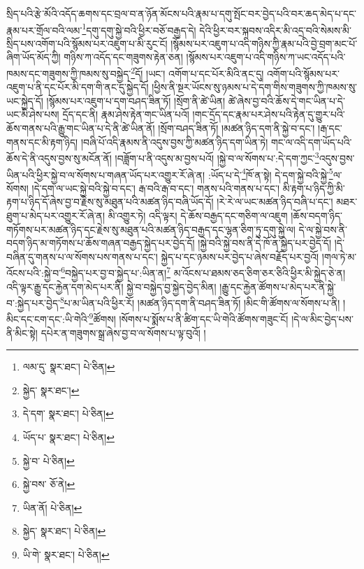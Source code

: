 སྲིད་པའི་རྩེ་མོའི་འདོད་ཆགས་དང་བྲལ་བ་ན་ཉོན་མོངས་པའི་རྣམ་པ་དགུ་སྤོང་བར་བྱེད་པའི་བར་ཆད་མེད་པ་དང་རྣམ་པར་གྲོལ་བའི་ལམ་\footnote{ལམ་དུ་  སྣར་ཐང་།  པེ་ཅིན། }དགུ་དགུ་སྐྱེ་བའི་ཕྱིར་བཅོ་བརྒྱད་དེ། དེའི་ཕྱིར་བར་སྐབས་འདིར་མི་འདྲ་བའི་སེམས་མི་སྲིད་པས་འགོག་པའི་སྙོམས་པར་འཇུག་པ་མི་རུང་ངོ། །སྙོམས་པར་འཇུག་པ་འདི་གཉིས་ཀྱི་རྣམ་པའི་བྱེ་བྲག་མང་པོ་ཞིག་ཡོད་མོད་ཀྱི། གཉིས་ཀ་འདོད་དང་གཟུགས་རྟེན་ཅན། །སྙོམས་པར་འཇུག་པ་འདི་གཉིས་ཀ་ཡང་འདོད་པའི་ཁམས་དང་གཟུགས་ཀྱི་ཁམས་སུ་བསྐྱེད་\footnote{སྐྱེད་  སྣར་ཐང་། }དོ། །ཡང་། འགོག་པ་དང་པོར་མིའི་ནང་དུ། འགོག་པའི་སྙོམས་པར་འཇུག་པ་ནི་དང་པོར་མི་དག་གི་ནང་དུ་སྐྱེད་དོ། །ཕྱིས་ནི་སྔར་ཡོངས་སུ་ཉམས་པ་དེ་དག་གིས་གཟུགས་ཀྱི་ཁམས་སུ་ཡང་སྐྱེད་དོ། །སྙོམས་པར་འཇུག་པ་དག་བཤད་ཟིན་ཏོ། །སྲོག་ནི་ཚེ་ཡིན། ཚེ་ཞེས་བྱ་བའི་ཆོས་དེ་གང་ཡིན་པ་དེ་ཡང་མི་ཤེས་པས། དྲོད་དང་ནི། རྣམ་ཤེས་རྟེན་གང་ཡིན་པའོ། །གང་དྲོད་དང་རྣམ་པར་ཤེས་པའི་རྟེན་དུ་གྱུར་པའི་ཆོས་གནས་པའི་རྒྱུ་གང་ཡིན་པ་དེ་ནི་ཚེ་ཡིན་ནོ། །སྲོག་བཤད་ཟིན་ཏོ། །མཚན་ཉིད་དག་ནི་སྐྱེ་བ་དང་། །རྒ་དང་གནས་དང་མི་རྟག་ཉིད། །བཞི་པོ་འདི་རྣམས་ནི་འདུས་བྱས་ཀྱི་མཚན་ཉིད་དག་ཡིན་ཏེ། གང་ལ་འདི་དག་ཡོད་པའི་ཆོས་དེ་ནི་འདུས་བྱས་སུ་མངོན་ནོ། །བཟློག་པ་ནི་འདུས་མ་བྱས་པའོ། །སྐྱེ་བ་ལ་སོགས་པ་:དེ་དག་ཀྱང་\footnote{དེ་དག་  སྣར་ཐང་།  པེ་ཅིན། }འདུས་བྱས་ཡིན་པའི་ཕྱིར་སྐྱེ་བ་ལ་སོགས་པ་གཞན་ཡོད་པར་འགྱུར་རོ་ཞེ་ན། :ཡོད་པ་དེ་\footnote{ཡོད་པ་  སྣར་ཐང་།  པེ་ཅིན། }ཁོ་ན་སྟེ། དེ་དག་སྐྱེ་བའི་སྐྱེ་\footnote{སྐྱེ་བ་  པེ་ཅིན། }ལ་སོགས། །དེ་དག་ལ་ཡང་སྐྱེ་བའི་སྐྱེ་བ་དང་། རྒ་བའི་རྒ་བ་དང་། གནས་པའི་གནས་པ་དང་། མི་རྟག་པ་ཉིད་ཀྱི་མི་རྟག་པ་ཉིད་དོ་ཞེས་བྱ་བ་རྗེས་སུ་མཐུན་པའི་མཚན་ཉིད་བཞི་ཡོད་དོ། །རེ་རེ་ལ་ཡང་མཚན་ཉིད་བཞི་པ་དང་། མཐར་ཐུག་པ་མེད་པར་འགྱུར་རོ་ཞེ་ན། མི་འགྱུར་ཏེ། འདི་ལྟར། དེ་ཆོས་བརྒྱད་དང་གཅིག་ལ་འཇུག །ཆོས་བདག་ཉིད་གཏོགས་པར་མཚན་ཉིད་དང་རྗེས་སུ་མཐུན་པའི་མཚན་ཉིད་བརྒྱད་དང་ལྷན་ཅིག་ཏུ་དགུ་སྐྱེ་ལ། དེ་ལ་སྐྱེ་བས་ནི་བདག་ཉིད་མ་གཏོགས་པ་ཆོས་གཞན་བརྒྱད་སྐྱེད་པར་བྱེད་དོ། །སྐྱེ་བའི་སྐྱེ་བས་ནི་དེ་ཁོ་ན་སྐྱེད་པར་བྱེད་དོ། །དེ་བཞིན་དུ་གནས་པ་ལ་སོགས་པས་གནས་པ་དང་། སྐྱེད་པ་དང་ཉམས་པར་བྱེད་པ་ཞེས་བརྗོད་པར་བྱའོ། །གལ་ཏེ་མ་འོངས་པའི་:སྐྱེ་བ་\footnote{སྐྱེ་བས་  ཅོ་ནེ། }བསྐྱེད་པར་བྱ་བ་སྐྱེད་པ་:ཡིན་ན།\footnote{ཡིན་ནོ།  པེ་ཅིན། } མ་འོངས་པ་ཐམས་ཅད་ཅིག་ཅར་ཅིའི་ཕྱིར་མི་སྐྱེད་ཅེ་ན། འདི་ལྟར་རྒྱུ་དང་རྐྱེན་དག་མེད་པར་ནི། སྐྱེ་བ་བསྐྱེད་བྱ་སྐྱེད་བྱེད་མིན། །རྒྱུ་དང་རྐྱེན་ཚོགས་པ་མེད་པར་ནི་སྐྱེ་བ་:སྐྱེད་པར་བྱེད་\footnote{སྐྱེད་  སྣར་ཐང་།  པེ་ཅིན། }པ་མ་ཡིན་པའི་ཕྱིར་རོ། །མཚན་ཉིད་དག་ནི་བཤད་ཟིན་ཏོ། །མིང་གི་ཚོགས་ལ་སོགས་པ་ནི། །མིང་དང་ངག་དང་:ཡི་གེའི་\footnote{ཡི་གེ་  སྣར་ཐང་།  པེ་ཅིན། }ཚོགས། །སོགས་པ་སྨོས་པ་ནི་ཚིག་དང་ཡི་གེའི་ཚོགས་གཟུང་ངོ། །དེ་ལ་མིང་བྱེད་པས་ནི་མིང་སྟེ། དཔེར་ན་གཟུགས་སྒྲ་ཞེས་བྱ་བ་ལ་སོགས་པ་ལྟ་བུའོ། །
